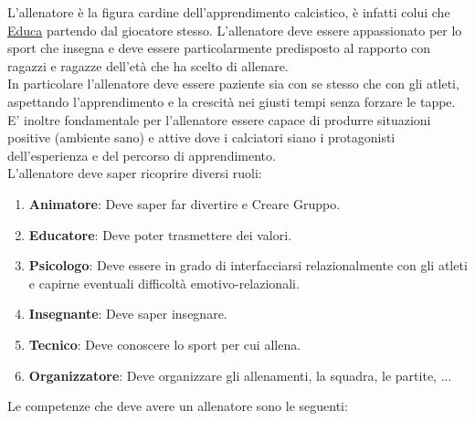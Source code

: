 \documentclass[../uefaC.tex]{subfiles}
\begin{document}

L'allenatore è la figura cardine dell'apprendimento calcistico, è infatti colui che \underline{Educa} partendo dal giocatore stesso. L'allenatore deve essere appassionato per lo sport che insegna e deve essere particolarmente predisposto al rapporto con ragazzi e ragazze dell'età che ha scelto di allenare. \hfill \\
In particolare l'allenatore deve essere paziente sia con se stesso che con gli atleti, aspettando l'apprendimento e la crescità nei giusti tempi senza forzare le tappe. \hfill \\
E' inoltre fondamentale per l'allenatore essere capace di produrre situazioni positive (ambiente sano) e attive dove i calciatori siano i protagonisti dell'esperienza e del percorso di apprendimento. \hfill \\
L'allenatore deve saper ricoprire diversi ruoli:
\begin{enumerate}
    \item\textbf{Animatore}: Deve saper far divertire e Creare Gruppo.
    \item\textbf{Educatore}: Deve poter trasmettere dei valori.
    \item\textbf{Psicologo}: Deve essere in grado di interfacciarsi relazionalmente con gli atleti e capirne eventuali difficoltà emotivo-relazionali.
    \item\textbf{Insegnante}: Deve saper insegnare.
    \item\textbf{Tecnico}: Deve conoscere lo sport per cui allena.
    \item\textbf{Organizzatore}: Deve organizzare gli allenamenti, la squadra, le partite, ...
\end{enumerate}
Le competenze che deve avere un allenatore sono le seguenti:
\end{document}
